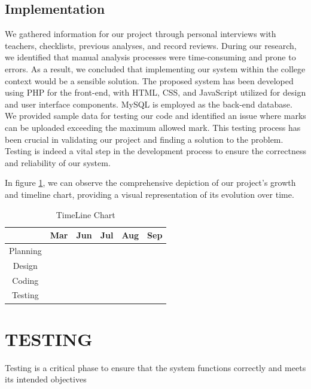 \documentclass{nascproject}
\begin{document}
\section{Implementation}
	We gathered information for our project through personal interviews with teachers, checklists, previous analyses, and record reviews. During our research, we identified that manual analysis processes were time-consuming and prone to errors. As a result, we concluded that implementing our system within the college context would be a sensible solution. 
The proposed system has been developed using PHP for the front-end, with HTML, CSS, and JavaScript utilized for design and user interface components. MySQL is employed as the back-end database. We provided sample data for testing our code and identified an issue where marks can be uploaded exceeding the maximum allowed mark. This testing process has been crucial in validating our project and finding a solution to the problem. Testing is indeed a vital step in the development process to ensure the correctness and reliability of our system.

	In figure \ref{timeline}, we can observe the comprehensive depiction of our project's growth and timeline chart, providing a visual representation of its evolution over time. 
	


	\begin{table}[h]
		\centering
		\begin{tabular}{|c|c|c|c|c|c|}
			\hline
			& Mar & Jun & Jul & Aug & Sep \\
			\hline
			Planning & \cellcolor{gray!30} & \cellcolor{gray!30} & & &  \\
			\cline{1-2}
			Design & & \cellcolor{gray!30} & \cellcolor{gray!30} & &  \\
			\cline{1-4}
			Coding & & & & \cellcolor{gray!30} & \cellcolor{gray!30}  \\
			\cline{1-6}
			Testing & & & & & \cellcolor{gray!30}  \\
			
		
		\end{tabular}
	\caption{TimeLine Chart}
	\label{timeline}
	\end{table}



\chapter{TESTING}
Testing is a critical phase to ensure that the system functions correctly and meets its intended objectives
\end{document}
